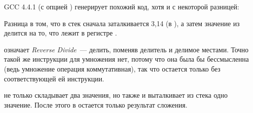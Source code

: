 
GCC 4.4.1 (с опцией \Othree) генерирует похожий код, хотя и с некоторой разницей:



Разница в том, что в стек сначала заталкивается 3,14 (в ), а затем значение 
из  делится на то, что лежит в регистре .

\FDIVR означает \emph{Reverse Divide}~--- делить, поменяв делитель и делимое местами. 
Точно такой же инструкции для умножения нет, потому что она была бы бессмысленна (ведь умножение 
операция коммутативная), так что остается только \FMUL без соответствующей ей  инструкции.

\FADDP не только складывает два значения, но также и выталкивает из стека одно значение. 
После этого в  остается только результат сложения.
